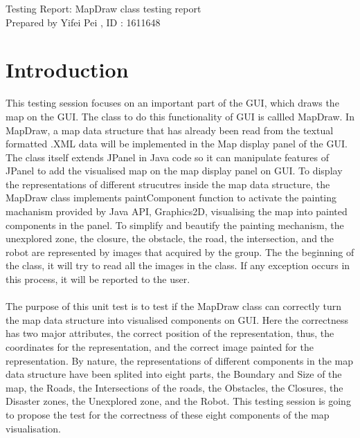 \documentclass[11pt, a4paper]{article}
\begin{document}
\begin{center}
\huge Testing Report: MapDraw class testing report
\\\large Prepared by Yifei Pei , ID : 1611648
\end{center}


\section{Introduction}

This testing session focuses on an important part of the GUI, which draws the map on the GUI. The class to do this functionality of GUI is callled MapDraw. In MapDraw, a map data structure that has already been read from the textual formatted .XML data will be implemented in the Map display panel of the GUI. The class itself extends JPanel in Java code so it can manipulate features of JPanel to add the visualised map on the map display panel on GUI. To display the representations of different strucutres inside the map data structure, the MapDraw class implements paintComponent function to activate the painting machanism provided by Java API, Graphics2D, visualising the map into painted components in the panel. To simplify and beautify the painting mechanism, the unexplored zone, the closure, the obstacle, the road, the intersection, and the robot are represented by images that acquired by the group. The the beginning of the class, it will try to read all the images in the class. If any exception occurs in this process, it will be reported to the user. \\
\\
The purpose of this unit test is to test if the MapDraw class can correctly turn the map data structure into visualised components on GUI. Here the correctness has two major attributes, the correct position of the representation, thus, the coordinates for the representation, and the correct image painted for the representation. By nature, the representations of different components in the map data structure have been splited into eight parts, the Boundary and Size of the map, the Roads, the Intersections of the roads, the Obstacles, the Closures, the Disaster zones, the Unexplored zone, and the Robot. This testing session is going to propose the test for the correctness of these eight components of the map visualisation. \\
\\
\end{document}
